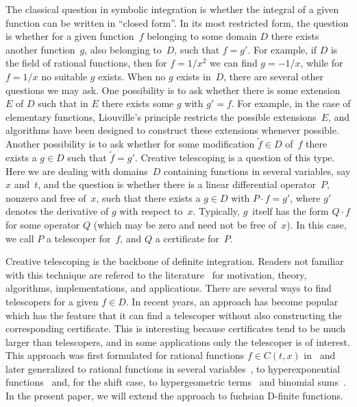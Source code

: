 \documentclass{sig-alternate}
\begin{document}
The classical question in symbolic integration is whether the integral of
a given function can be written in ``closed form''. In its most restricted form,
the question is whether for a given function~$f$ belonging to some domain $D$
there exists another function~$g$, also belonging to~$D$, such that $f=g'$. For
example, if $D$ is the field of rational functions, then for $f=1/x^2$ we can
find $g=-1/x$, while for $f=1/x$ no suitable $g$ exists. When no $g$ exists
in~$D$, there are several other questions we may ask. One possibility is to ask
whether there is some extension~$E$ of $D$ such that in $E$ there exists some
$g$ with $g'=f$. For example, in the case of elementary functions, Liouville's
principle restricts the possible extensions~$E$, and algorithms have been
designed to construct these extensions whenever possible. Another possibility is
to ask whether for some modification $\tilde f\in D$ of~$f$ there exists a $g\in
D$ such that $\tilde f=g'$. Creative telescoping is a question of this
type. Here we are dealing with domains~$D$ containing functions in several
variables, say $x$ and~$t$, and the question is whether there is a linear
differential operator~$P$, nonzero and free of~$x$, such that there exists a
$g\in D$ with $P\cdot f=g'$, where $g'$ denotes the derivative of $g$ with
respect to~$x$. Typically, $g$~itself has the form $Q\cdot f$ for some operator
$Q$ (which may be zero and need not be free of~$x$). In this case, we call $P$
a telescoper for~$f$, and $Q$ a certificate for~$P$.

Creative telescoping is the backbone of definite integration. Readers not
familiar with this technique are refered to the literature~\cite{PWZbook1996,Zeilberger1990c,Zeilberger1991,Zeilberger1990,Koepf1998}
for motivation, theory, algorithms, implementations, and applications. There are
several ways to find telescopers for a given $f\in D$. In recent years, an
approach has become popular which has the feature that it can find a telescoper
without also constructing the corresponding certificate. This is interesting
because certificates tend to be much larger than telescopers, and in some
applications only the telescoper is of interest. This approach was first
formulated for rational functions $f\in C(t,x)$ in~\cite{BCCL2010} and later
generalized to rational functions in several variables~\cite{..}, to
hyperexponential functions~\cite{..} and, for the shift case, to hypergeometric
terms~\cite{..} and binomial sums~\cite{..}. In the present paper, we will extend
the approach to fuchsian D-finite functions.
\end{document}
